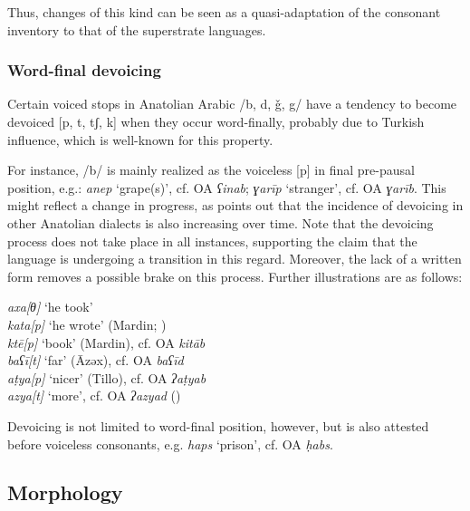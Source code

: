 \documentclass[output=paper]{langsci/langscibook}
\begin{document}
Thus, changes of this kind can be seen as a quasi-adaptation of the consonant inventory to that of the superstrate languages.

\subsubsection{Word-final devoicing}

Certain voiced stops in Anatolian Arabic /b, d, ǧ, g/ have a tendency to become devoiced [p, t, tʃ, k] when they occur word-finally, probably due to Turkish influence, which is well-known for this property.

For instance, /b/ is mainly realized as the voiceless [p] in final pre-pausal position, e.g.: \textit{anep} `grape(s)',
cf. OA \textit{ʕinab}; \textit{ɣarīp} `stranger', cf. OA \textit{ɣarīb}. This might reflect a change in progress, as \cite{Lahdo2009} points out that the incidence of devoicing in other Anatolian dialects is also increasing over time. Note that the devoicing process does not take place in all instances, supporting the claim that the language is
undergoing a transition in this regard. Moreover, the lack of a written form removes a possible brake on this process. Further illustrations are as follows:

\ea
\noindent \textit{axa[θ]} `he took’\\
\textit{kata[p]} `he wrote’ (Mardin; \citealt[90]{Jastrow2011anatolian})\\
\textit{kt\={e}[p]} `book' (Mardin), cf. OA \textit{kit\={a}b}\\
\textit{baʕī[t]} `far' (\={A}zəx), cf. OA \textit{baʕ\={i}d}\\
\textit{a\d{t}ya[p]} `nicer' (Tillo), cf. OA \textit{ʔa\d{t}yab} \\
\textit{azya[t]} `more', cf. OA \textit{ʔazyad} (\citealt[106]{Lahdo2009})\\
\z

\noindent Devoicing is not limited to word-final position, however, but is also attested before voiceless consonants, e.g. \textit{haps} `prison', cf. OA \textit{ḥabs}. %

\subsection{Morphology}
\end{document}
